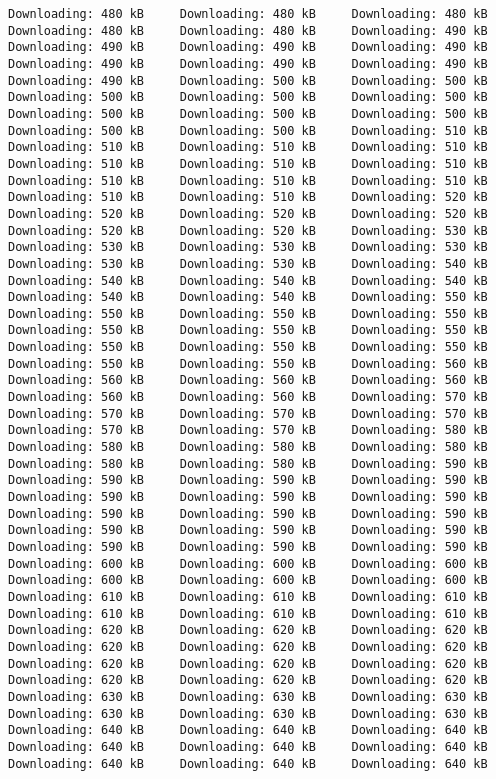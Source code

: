 \documentclass[
  12pt,
]{report}
\begin{document}
\begin{verbatim}
Downloading: 480 kB     Downloading: 480 kB     Downloading: 480 kB     Downloading: 480 kB     Downloading: 480 kB     Downloading: 490 kB     Downloading: 490 kB     Downloading: 490 kB     Downloading: 490 kB     Downloading: 490 kB     Downloading: 490 kB     Downloading: 490 kB     Downloading: 490 kB     Downloading: 500 kB     Downloading: 500 kB     Downloading: 500 kB     Downloading: 500 kB     Downloading: 500 kB     Downloading: 500 kB     Downloading: 500 kB     Downloading: 500 kB     Downloading: 500 kB     Downloading: 500 kB     Downloading: 510 kB     Downloading: 510 kB     Downloading: 510 kB     Downloading: 510 kB     Downloading: 510 kB     Downloading: 510 kB     Downloading: 510 kB     Downloading: 510 kB     Downloading: 510 kB     Downloading: 510 kB     Downloading: 510 kB     Downloading: 510 kB     Downloading: 520 kB     Downloading: 520 kB     Downloading: 520 kB     Downloading: 520 kB     Downloading: 520 kB     Downloading: 520 kB     Downloading: 530 kB     Downloading: 530 kB     Downloading: 530 kB     Downloading: 530 kB     Downloading: 530 kB     Downloading: 530 kB     Downloading: 540 kB     Downloading: 540 kB     Downloading: 540 kB     Downloading: 540 kB     Downloading: 540 kB     Downloading: 540 kB     Downloading: 550 kB     Downloading: 550 kB     Downloading: 550 kB     Downloading: 550 kB     Downloading: 550 kB     Downloading: 550 kB     Downloading: 550 kB     Downloading: 550 kB     Downloading: 550 kB     Downloading: 550 kB     Downloading: 550 kB     Downloading: 550 kB     Downloading: 560 kB     Downloading: 560 kB     Downloading: 560 kB     Downloading: 560 kB     Downloading: 560 kB     Downloading: 560 kB     Downloading: 570 kB     Downloading: 570 kB     Downloading: 570 kB     Downloading: 570 kB     Downloading: 570 kB     Downloading: 570 kB     Downloading: 580 kB     Downloading: 580 kB     Downloading: 580 kB     Downloading: 580 kB     Downloading: 580 kB     Downloading: 580 kB     Downloading: 590 kB     Downloading: 590 kB     Downloading: 590 kB     Downloading: 590 kB     Downloading: 590 kB     Downloading: 590 kB     Downloading: 590 kB     Downloading: 590 kB     Downloading: 590 kB     Downloading: 590 kB     Downloading: 590 kB     Downloading: 590 kB     Downloading: 590 kB     Downloading: 590 kB     Downloading: 590 kB     Downloading: 590 kB     Downloading: 600 kB     Downloading: 600 kB     Downloading: 600 kB     Downloading: 600 kB     Downloading: 600 kB     Downloading: 600 kB     Downloading: 610 kB     Downloading: 610 kB     Downloading: 610 kB     Downloading: 610 kB     Downloading: 610 kB     Downloading: 610 kB     Downloading: 620 kB     Downloading: 620 kB     Downloading: 620 kB     Downloading: 620 kB     Downloading: 620 kB     Downloading: 620 kB     Downloading: 620 kB     Downloading: 620 kB     Downloading: 620 kB     Downloading: 620 kB     Downloading: 620 kB     Downloading: 620 kB     Downloading: 630 kB     Downloading: 630 kB     Downloading: 630 kB     Downloading: 630 kB     Downloading: 630 kB     Downloading: 630 kB     Downloading: 640 kB     Downloading: 640 kB     Downloading: 640 kB     Downloading: 640 kB     Downloading: 640 kB     Downloading: 640 kB     Downloading: 640 kB     Downloading: 640 kB     Downloading: 640 kB     
\end{verbatim}
\end{document}
